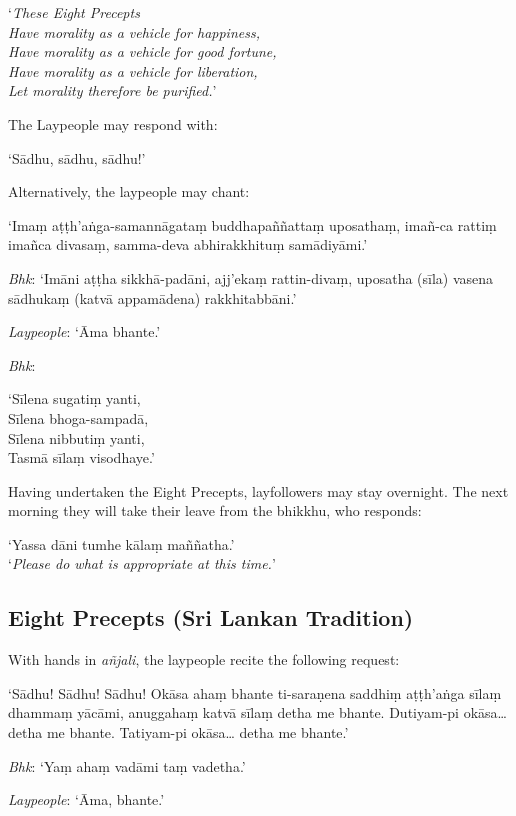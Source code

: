 ‘\emph{These Eight Precepts\\
Have morality as a vehicle for happiness,\\
Have morality as a vehicle for good fortune,\\
Have morality as a vehicle for liberation,\\
Let morality therefore be purified.}’

The Laypeople may respond with:

‘Sādhu, sādhu, sādhu!’

Alternatively, the laypeople may chant:

‘Imaṃ aṭṭh'aṅga-samannāgataṃ buddhapaññattaṃ uposathaṃ, imañ-ca rattiṃ imañca
divasaṃ, samma-deva abhirakkhituṃ samādiyāmi.’

\emph{Bhk}: ‘Imāni aṭṭha sikkhā-padāni, ajj'ekaṃ rattin-divaṃ, uposatha (sīla)
vasena sādhukaṃ (katvā appamādena) rakkhitabbāni.’

\emph{Laypeople}: ‘Āma bhante.’

\emph{Bhk}:

‘Sīlena sugatiṃ yanti,\\
Sīlena bhoga-sampadā,\\
Sīlena nibbutiṃ yanti,\\
Tasmā sīlaṃ visodhaye.’

Having undertaken the Eight Precepts, layfollowers may stay overnight. The next
morning they will take their leave from the bhikkhu, who responds:

‘Yassa dāni tumhe kālaṃ maññatha.’\\
‘\emph{Please do what is appropriate at this time.}’


\subsection{Eight Precepts (Sri Lankan Tradition)}


With hands in \emph{añjali}, the laypeople recite the following request:

‘Sādhu! Sādhu! Sādhu! Okāsa ahaṃ bhante ti-saraṇena saddhiṃ aṭṭh'aṅga sīlaṃ
dhammaṃ yācāmi, anuggahaṃ katvā sīlaṃ detha me bhante. Dutiyam-pi okāsa… detha
me bhante. Tatiyam-pi okāsa… detha me bhante.’

\emph{Bhk}: ‘Yaṃ ahaṃ vadāmi taṃ vadetha.’

\emph{Laypeople}: ‘Āma, bhante.’

